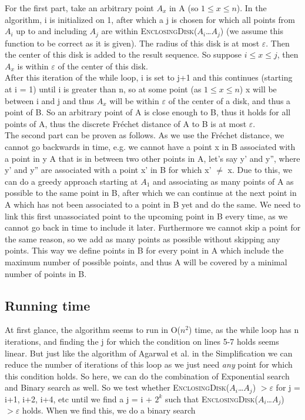 \documentclass[a4paper,11pt]{article}
\begin{document}
For the first part, take an arbitrary point $A_x$ in A (so $1 \leq x \leq n$). In the algorithm, i is initialized on 1, after which a j is chosen for which all points from $A_i$ up to and including $A_j$ are within \textsc{EnclosingDisk($A_i$\dots $A_j$)} (we assume this function to be correct as it is given). The radius of this disk is at most $\varepsilon$. Then the center of this disk is added to the result sequence. So suppose $i \leq x \leq j$, then $A_x$ is within $\varepsilon$ of the center of this disk.\\
After this iteration of the while loop, i is set to j+1 and this continues (starting at i = 1) until i is greater than n, so at some point (as $1 \leq x \leq n$) x will be between i and j and thus $A_x$ will be within $\varepsilon$ of the center of a disk, and thus a point of B. So an arbitrary point of A is close enough to B, thus it holds for all points of A, thus the discrete Fr\'{e}chet distance of A to B is at most $\varepsilon$.\\

The second part can be proven as follows. As we use the Fr\'{e}chet distance, we cannot go backwards in time, e.g. we cannot have a point x in B associated with a point in y A that is in between two other points in A, let's say y' and y'', where y' and y'' are associated with a point x' in B for which x' $\neq$ x. Due to this, we can do a greedy approach starting at $A_1$ and associating as many points of A as possible to the same point in B, after which we can continue at the next point in A which has not been associated to a point in B yet and do the same. We need to link this first unassociated point to the upcoming point in B every time, as we cannot go back in time to include it later. Furthermore we cannot skip a point for the same reason, so we add as many points as possible without skipping any points. This way we define points in B for every point in A which include the maximum number of possible points, and thus A will be covered by a minimal number of points in B.

\subsection*{Running time}
At first glance, the algorithm seems to run in O($n^2$) time, as the while loop has n iterations, and finding the j for which the condition on lines 5-7 holds seems linear. But just like the algorithm of Agarwal et al. in the Simplification we can reduce the number of iterations of this loop as we just need \textit{any} point for which this condition holds. So here, we can do the combination of Exponential search and Binary search as well. So we test whether \textsc{EnclosingDisk($A_i$\dots $A_j$)} $> \varepsilon$ for j = i+1, i+2, i+4, etc until we find a j = i + $2^k$ such that \textsc{EnclosingDisk($A_i$\dots $A_j$)} $> \varepsilon$ holds. When we find this, we do a binary search 
\end{document}
